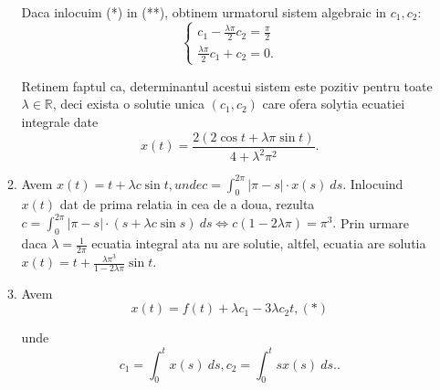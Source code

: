 \documentclass[a4paper,12pt,oneside]{report}
\begin{document}
\begin{enumerate}
\begin{enumerate}[label=(\alph*)]
		      		      Daca inlocuim (*) in (**), obtinem urmatorul sistem algebraic in \(c_{1}, c_{2}\):
		      		      \begin{displaymath}
		      		      	\left\{\begin{matrix}
		      		      	c_{1} - \frac{\lambda \pi }{2}c_{2} = \frac{\pi }{2}\\ 
		      		      	\frac{\lambda \pi }{2}c_{1} + c_{2} = 0.
		      		      	\end{matrix}\right.
		      		      \end{displaymath}
		      		      		      		      		      		      		      		      
		      		      Retinem faptul ca, determinantul acestui sistem este pozitiv pentru toate \(\lambda \in \mathbb{R}\), deci exista o solutie unica \(\left ( c_{1} , c_{2}\right )\) care ofera solytia ecuatiei integrale date 
		      		      \begin{displaymath}
		      		      	x\left ( t \right ) = \frac{2\left ( 2\cos t+ \lambda\pi\sin t \right )}{4 + \lambda^{2}\pi^{2}}. 
		      		      \end{displaymath}
		      		      		      		      		      		      		      		      
		      		\item Avem \(x\left ( t \right ) = t + \lambda c \sin t, unde c = \int_{0}^{2\pi}\left | \pi - s \right |\cdot x\left ( s \right ) \ ds\). Inlocuind \(x\left ( t \right )\) dat de prima relatia in cea de a doua, rezulta 
		      		      \(c = \int_{0}^{2\pi} \left | \pi - s \right | \cdot \left ( s+ \lambda c\sin s \right ) \ ds \Leftrightarrow c\left ( 1- 2\lambda \pi \right ) = \pi^{3}.\)
		      		      Prin urmare daca \(\lambda = \frac{1}{2\pi}\) ecuatia integral ata nu are solutie, altfel, ecuatia are solutia
		      		      \(x\left ( t \right ) = t + \frac{\lambda \pi ^{3}}{1 - 2 \lambda \pi}\sin t\).
		      		      		      		      		      		      		      		     
		      		\item Avem 
		      		      \begin{displaymath}
		      		      	x\left ( t \right ) = f \left ( t \right ) + \lambda c_{1} - 3 \lambda c_{2}t, (*)
		      		      \end{displaymath}
		      		      		      		      		      		      
		      		      unde 
		      		      \begin{displaymath}
		      		      	c_{1} = \int_{0}^{t} x\left ( s \right ) \ ds,c_{2} = \int_{0}^{t} sx\left ( s \right ) \ ds..
		      		      \end{displaymath}
		      		      		      		      		      		      

\end{enumerate}
\end{enumerate}
\end{document}

